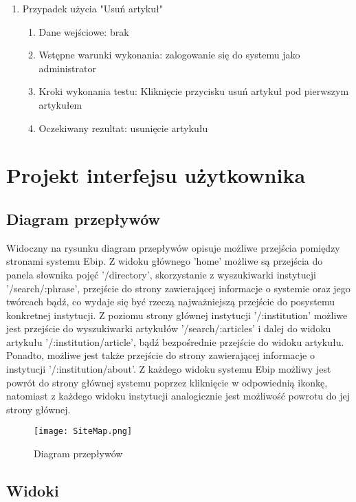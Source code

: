\documentclass{article}
\begin{document}
\begin{enumerate}
	\item Przypadek użycia "Usuń artykuł"
		\begin{enumerate}
		\item Dane wejściowe: brak
		\item Wstępne warunki wykonania: zalogowanie się do systemu jako administrator
		\item Kroki wykonania testu: Kliknięcie przycisku usuń artykuł pod pierwszym artykułem
		\item Oczekiwany rezultat: usunięcie artykułu
		\end{enumerate}
	\end{enumerate}
		

\section{Projekt interfejsu użytkownika}

\subsection{Diagram przepływów}

	Widoczny na rysunku diagram przepływów opisuje możliwe przejścia pomiędzy 
	stronami systemu Ebip. Z widoku głównego 'home' możliwe są przejścia do panela 
	słownika pojęć '/directory', skorzystanie z wyszukiwarki instytucji 
	'/search/:phrase', przejście do strony zawierającej informacje o systemie oraz 
	jego twórcach bądź, co wydaje się być rzeczą najważniejszą przejście do posystemu
	konkretnej instytucji.
	Z poziomu strony głównej instytucji '/:institution' możliwe jest przejście
	do wyszukiwarki artykułów '/search/:articles' i dalej do widoku artykułu
	'/:institution/article', bądź bezpośrednie przejście do widoku artykułu. 
	Ponadto, możliwe jest także przejście do strony zawierającej informacje
	o instytucji '/:institution/about'.
	Z każdego widoku systemu Ebip możliwy jest powrót do strony głównej 
	systemu poprzez kliknięcie w odpowiednią ikonkę, natomiast z każdego 
	widoku instytucji analogicznie jest możliwość powrotu do jej strony głównej.

\begin{figure}[h!]
	\texttt{[image: SiteMap.png]}
	\centering
	\caption{Diagram przepływów}
\end{figure}
	\newpage
\subsection{Widoki}
\end{document}
